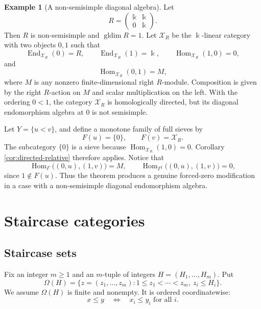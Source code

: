 \documentclass[12pt,a4paper,english,reqno]{amsart}
\theoremstyle{plain}
\theoremstyle{definition}
\newtheorem{exm}[theorem]{Example}
\newcommand{\kk}{\Bbbk}
\newcommand{\Hom}{\operatorname{Hom}}
\newcommand{\End}{\operatorname{End}}
\newcommand{\gldim}{\operatorname{gldim}}
\newcommand{\X}{\mathcal X}
\newcommand{\G}{\Gamma}
\newcommand{\Gs}{\Gamma^{\sharp}}
\begin{document}
\begin{exm}[A non-semisimple diagonal algebra]
Let
\[
 R=
 \begin{pmatrix}
  \kk&\kk\\
  0&\kk
 \end{pmatrix}.
\]
Then $R$ is non-semisimple and $\gldim R=1$.  Let $\X_R$ be the
$\kk$-linear category with two objects $0,1$ such that
\[
 \End_{\X_R}(0)=R,
 \qquad
 \End_{\X_R}(1)=\kk,
 \qquad
 \Hom_{\X_R}(1,0)=0,
\]
and
\[
 \Hom_{\X_R}(0,1)=M,
\]
where $M$ is any nonzero finite-dimensional right $R$-module.  Composition
is given by the right $R$-action on $M$ and scalar multiplication on the
left.  With the ordering $0<1$, the category $\X_R$ is homologically
directed, but its diagonal endomorphism algebra at $0$ is not semisimple.

Let $Y=\{u<v\}$, and define a monotone family of full sieves by
\[
 F(u)=\{0\},
 \qquad
 F(v)=\X_R.
\]
The subcategory $\{0\}$ is a sieve because
$\Hom_{\X_R}(1,0)=0$.  Corollary \ref{cor:directed-relative} therefore
applies.  Notice that
\[
 \Hom_{\G}\bigl((0,u),(1,v)\bigr)=M,
 \qquad
 \Hom_{\Gs}\bigl((0,u),(1,v)\bigr)=0,
\]
since $1\notin F(u)$.  Thus the theorem produces a genuine forced-zero
modification in a case with a non-semisimple diagonal endomorphism algebra.
\end{exm}


\section{Staircase categories}
\label{sec:staircase}

\subsection{Staircase sets}

Fix an integer $m\geq1$ and an $m$-tuple of integers
$H=(H_1,\ldots,H_m)$.  Put
\begin{equation}
 \Omega(H)=
 \{z=(z_1,\ldots,z_m):
 1\leq z_1<\cdots<z_m,\ z_i\leq H_i\}.
\label{eq:staircase}
\end{equation}
We assume $\Omega(H)$ is finite and nonempty.  It is ordered
coordinatewise:
\[
 x\leq y\quad\Longleftrightarrow\quad x_i\leq y_i
 \text{ for all }i.
\]
\end{document}
